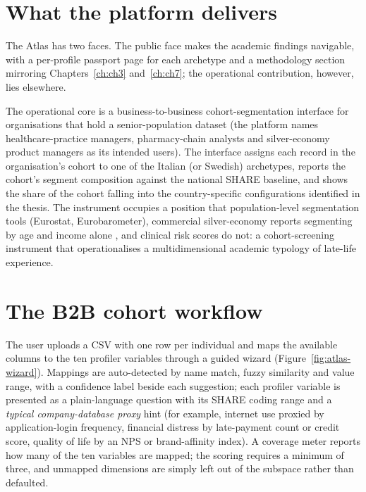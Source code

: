 \section{What the platform delivers}
\label{sec:atlas-delivers}

The Atlas has two faces. The public face makes the academic findings navigable, with a per-profile passport page for each archetype and a methodology section mirroring Chapters~\ref{ch:ch3} and~\ref{ch:ch7}; the operational contribution, however, lies elsewhere.

The operational core is a business-to-business cohort-segmentation interface for organisations that hold a senior-population dataset (the platform names healthcare-practice managers, pharmacy-chain analysts and silver-economy product managers as its intended users). The interface assigns each record in the organisation's cohort to one of the Italian (or Swedish) archetypes, reports the cohort's segment composition against the national SHARE baseline, and shows the share of the cohort falling into the country-specific configurations identified in the thesis. The instrument occupies a position that population-level segmentation tools (Eurostat, Eurobarometer), commercial silver-economy reports segmenting by age and income alone \citep{vuik2016}, and clinical risk scores do not: a cohort-screening instrument that operationalises a multidimensional academic typology of late-life experience.

\section{The B2B cohort workflow}
\label{sec:atlas-workflow}

The user uploads a CSV with one row per individual and maps the available columns to the ten profiler variables through a guided wizard (Figure~\ref{fig:atlas-wizard}). Mappings are auto-detected by name match, fuzzy similarity and value range, with a confidence label beside each suggestion; each profiler variable is presented as a plain-language question with its SHARE coding range and a \emph{typical company-database proxy} hint (for example, internet use proxied by application-login frequency, financial distress by late-payment count or credit score, quality of life by an NPS or brand-affinity index). A coverage meter reports how many of the ten variables are mapped; the scoring requires a minimum of three, and unmapped dimensions are simply left out of the subspace rather than defaulted.

